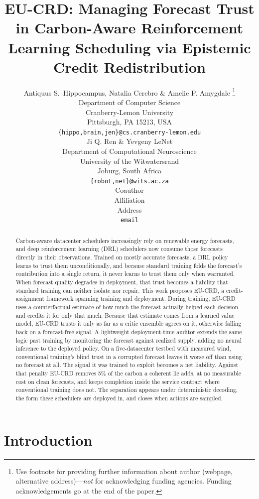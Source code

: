 \documentclass{article} %
\title{EU-CRD: Managing Forecast Trust in Carbon-Aware Reinforcement Learning Scheduling via Epistemic Credit Redistribution}
\author{Antiquus S.~Hippocampus, Natalia Cerebro \& Amelie P. Amygdale \thanks{ Use footnote for providing further information
about author (webpage, alternative address)---\emph{not} for acknowledging
funding agencies.  Funding acknowledgements go at the end of the paper.} \\
Department of Computer Science\\
Cranberry-Lemon University\\
Pittsburgh, PA 15213, USA \\
\texttt{\{hippo,brain,jen\}@cs.cranberry-lemon.edu} \\
\And
Ji Q. Ren \& Yevgeny LeNet \\
Department of Computational Neuroscience \\
University of the Witwatersrand \\
Joburg, South Africa \\
\texttt{\{robot,net\}@wits.ac.za} \\
\AND
Coauthor \\
Affiliation \\
Address \\
\texttt{email} }
\newcommand{\ResContain}{5\%}          %
\begin{document}
\maketitle


\begin{abstract}
Carbon-aware datacenter schedulers increasingly rely on renewable energy forecasts, and deep reinforcement learning (DRL) schedulers now consume those forecasts directly in their observations. Trained on mostly accurate forecasts, a DRL policy learns to trust them unconditionally, and because standard training folds the forecast's contribution into a single return, it never learns to trust them only when warranted. When forecast quality degrades in deployment, that trust becomes a liability that standard training can neither isolate nor repair. This work proposes EU-CRD, a credit-assignment framework spanning training and deployment. During training, EU-CRD uses a counterfactual estimate of how much the forecast actually helped each decision and credits it for only that much. Because that estimate comes from a learned value model, EU-CRD trusts it only as far as a critic ensemble agrees on it, otherwise falling back on a forecast-free signal. A lightweight deployment-time auditor extends the same logic past training by monitoring the forecast against realized supply, adding no neural inference to the deployed policy. On a five-datacenter testbed with measured wind, conventional training's blind trust in a corrupted forecast leaves it worse off than using no forecast at all. The signal it was trained to exploit becomes a net liability. Against that penalty EU-CRD removes \ResContain{} of the carbon a coherent lie adds, at no measurable cost on clean forecasts, and keeps completion inside the service contract where conventional training does not. The separation appears under deterministic decoding, the form these schedulers are deployed in, and closes when actions are sampled.
\end{abstract}


\section{Introduction}
\label{sec:intro}
\end{document}
